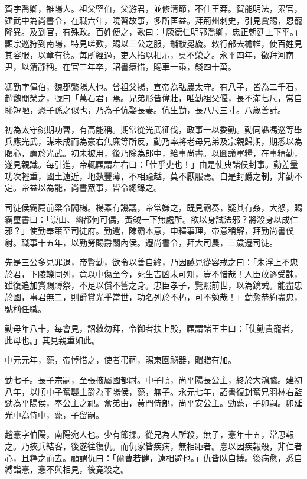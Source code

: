 \begin{pinyinscope}
賀字喬卿，雒陽人。祖父堅伯，父游君，並修清節，不仕王莽。賀能明法，累官，建武中為尚書令，在職六年，曉習故事，多所匡益。拜荊州刺史，引見賞賜，恩寵隆異。及到官，有殊政。百姓便之，歌曰：「厥德仁明郭喬卿，忠正朝廷上下平。」顯宗巡狩到南陽，特見嗟歎，賜以三公之服，黼黻冕旒。敕行部去襜帷，使百姓見其容服，以章有德。每所經過，吏人指以相示，莫不榮之。永平四年，徵拜河南尹，以清靜稱。在官三年卒，詔書癏惜，賜車一乘，錢四十萬。

馮勤字偉伯，魏郡繁陽人也。曾祖父揚，宣帝為弘農太守。有八子，皆為二千石，趙魏閒榮之，號曰「萬石君」焉。兄弟形皆偉壯，唯勤祖父偃，長不滿七尺，常自恥短陋，恐子孫之似也，乃為子伉娶長妻。伉生勤，長八尺三寸。八歲善計。

初為太守銚期功曹，有高能稱。期常從光武征伐，政事一以委勤。勤同縣馮巡等舉兵應光武，謀未成而為豪右焦廉等所反，勤乃率將老母兄弟及宗親歸期，期悉以為腹心，薦於光武。初未被用，後乃除為郎中，給事尚書。以圖議軍糧，在事精勤，遂見親識。每引進，帝輒顧謂左右曰：「佳乎吏也！」由是使典諸侯封事。勤差量功次輕重，國土遠近，地埶豐薄，不相踰越，莫不厭服焉。自是封爵之制，非勤不定。帝益以為能，尚書眾事，皆令總錄之。

司徒侯霸薦前梁令閻楊。楊素有譏議，帝常嫌之，既見霸奏，疑其有姦，大怒，賜霸璽書曰：「崇山、幽都何可偶，黃鉞一下無處所。欲以身試法邪？將殺身以成仁邪？」使勤奉策至司徒府。勤還，陳霸本意，申釋事理，帝意稍解，拜勤尚書僕射。職事十五年，以勤勞賜爵關內侯。遷尚書令，拜大司農，三歲遷司徒。

先是三公多見罪退，帝賢勤，欲令以善自終，乃因讌見從容戒之曰：「朱浮上不忠於君，下陵轢同列，竟以中傷至今，死生吉凶未可知，豈不惜哉！人臣放逐受誅，雖復追加賞賜賻祭，不足以償不訾之身。忠臣孝子，覽照前世，以為鏡誡。能盡忠於國，事君無二，則爵賞光乎當世，功名列於不朽，可不勉哉！」勤愈恭約盡忠，號稱任職。

勤母年八十，每會見，詔敕勿拜，令御者扶上殿，顧謂諸王主曰：「使勤貴寵者，此母也。」其見親重如此。

中元元年，薨，帝悼惜之，使者弔祠，賜東園祕器，賵贈有加。

勤七子。長子宗嗣，至張掖屬國都尉。中子順，尚平陽長公主，終於大鴻臚。建初八年，以順中子奮襲主爵為平陽侯，薨，無子。永元七年，詔書復封奮兄羽林右監勁為平陽侯，奉公主之祀。奮弟由，黃門侍郎，尚平安公主。勁薨，子卯嗣。卯延光中為侍中，薨，子留嗣。

趙憙字伯陽，南陽宛人也。少有節操。從兄為人所殺，無子，憙年十五，常思報之。乃挾兵結客，後遂往復仇。而仇家皆疾病，無相距者。憙以因疾報殺，非仁者心，且釋之而去。顧謂仇曰：「爾曹若健，遠相避也。」仇皆臥自搏。後病愈，悉自縛詣憙，憙不與相見，後竟殺之。


\end{pinyinscope}
